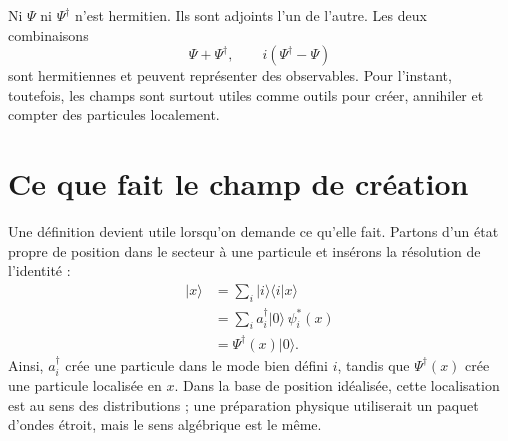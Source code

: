 Ni \(\Psi\) ni \(\Psi^\dagger\) n’est hermitien. Ils sont adjoints l’un de l’autre. Les deux combinaisons
\begin{equation}
\Psi+\Psi^\dagger,
\qquad
i(\Psi^\dagger-\Psi)
\label{eq:l07-hermitian-combinations}
\end{equation}
sont hermitiennes et peuvent représenter des observables. Pour l’instant, toutefois, les champs sont surtout utiles comme outils pour créer, annihiler et compter des particules localement.

\begin{classroomqa}
\end{classroomqa}

\section{Ce que fait le champ de création}

Une définition devient utile lorsqu’on demande ce qu’elle fait. Partons d’un état propre de position dans le secteur à une particule et insérons la résolution de l’identité :
\begin{align}
|x\rangle
&=\sum_i |i\rangle\langle i|x\rangle \\
&=\sum_i a_i^\dagger|0\rangle\,\psi_i^*(x) \\
&=\Psi^\dagger(x)|0\rangle.
\label{eq:l07-local-creation}
\end{align}
Ainsi, \(a_i^\dagger\) crée une particule dans le mode bien défini \(i\), tandis que \(\Psi^\dagger(x)\) crée une particule localisée en \(x\). Dans la base de position idéalisée, cette localisation est au sens des distributions ; une préparation physique utiliserait un paquet d’ondes étroit, mais le sens algébrique est le même.

\begin{classroomqa}
\end{classroomqa}


